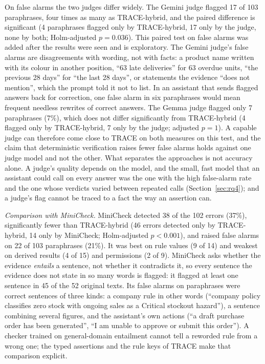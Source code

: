 \documentclass[journal]{IEEEtran}
\renewcommand{\paragraph}[1]{\par\textit{#1}\enspace}
\newcommand{\HELDOUTMINIGEMMA}{\paragraph{Comparison with MiniCheck.} MiniCheck detected 38 of the 102 errors (37\%), significantly fewer than
TRACE-hybrid (46 errors detected only by TRACE-hybrid, 14 only by MiniCheck; Holm-adjusted $p<0.001$), and
raised false alarms on 22 of 103 paraphrases (21\%). It was best on rule values (9 of 14) and weakest on
derived results (4 of 15) and permissions (2 of 9). MiniCheck asks whether the evidence \emph{entails} a
sentence, not whether it contradicts it, so every sentence the evidence does not state in so many words is
flagged: it flagged at least one sentence in 45 of the 52 original texts. Its false alarms on paraphrases were
correct sentences of three kinds: a company rule in other words (``company policy classifies zero stock with
ongoing sales as a Critical stockout hazard''), a sentence combining several figures, and the assistant's own
actions (``a draft purchase order has been generated'', ``I am unable to approve or submit this order''). A
checker trained on general-domain entailment cannot tell a reworded rule from a wrong one; the typed
assertions and the rule keys of TRACE make that comparison explicit.}
\begin{document}
On false alarms the two judges differ widely. The Gemini judge flagged 17 of 103 paraphrases, four times as
many as TRACE-hybrid, and the paired difference is significant (4 paraphrases flagged only by TRACE-hybrid,
17 only by the judge, none by both; Holm-adjusted $p=0.036$). This paired test on false alarms was added
after the results were seen and is exploratory. The Gemini judge's false alarms are disagreements with
wording, not with facts: a product name written with its colour in another position, ``63 late deliveries''
for 63 overdue units, ``the previous 28 days'' for ``the last 28 days'', or statements the evidence ``does
not mention'', which the prompt told it not to list. In an assistant that sends flagged answers back for
correction, one false alarm in six paraphrases would mean frequent needless rewrites of correct answers.
The Gemma judge flagged only 7 paraphrases (7\%), which does not differ significantly from TRACE-hybrid
(4 flagged only by TRACE-hybrid, 7 only by the judge; adjusted $p=1$). A capable judge can therefore
come close to TRACE on both measures on this test, and the claim that deterministic verification raises
fewer false alarms holds against one judge model and not the other. What separates the approaches is
not accuracy alone. A judge's quality depends on the model, and the small, fast model that an assistant
could call on every answer was the one with the high false-alarm rate and the one whose verdicts varied
between repeated calls (Section~\ref{sec:rq4}); and a judge's flag cannot be traced to a fact the way an
assertion can.

\HELDOUTMINIGEMMA
\end{document}
